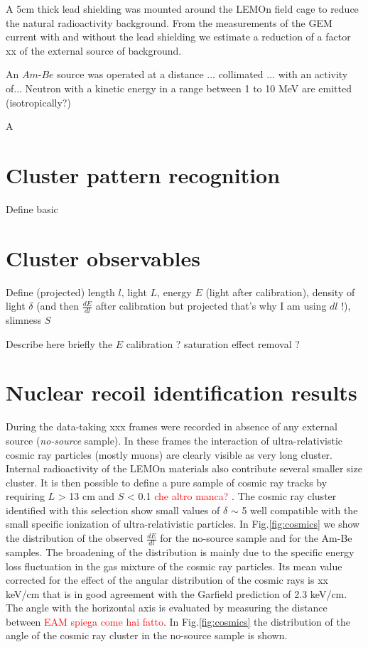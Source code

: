 \documentclass[12pt]{iopart}
\begin{document}
A  5cm thick lead shielding was mounted around the LEMOn field cage to reduce the natural radioactivity background. From the measurements of the GEM current with and without the lead shielding  we estimate a reduction of a factor xx of the external source of background.

 An $Am$-$Be$ source was operated  at a distance ... collimated ... with an activity of...
 Neutron with a kinetic energy in a range between 1 to 10 MeV are emitted (isotropically?) 
 
 A 
 







 \section{Cluster pattern recognition}
 

Define basic 
 \section{Cluster observables}
 
 Define  (projected) length $l$, light $L$, energy $E$ (light after calibration), density of light $\delta$ (and then $\frac{dE}{dl}$ after calibration but projected that's why I am using $dl$ !), slimness $S$
 
 Describe here briefly the $E$ calibration ? saturation effect removal ? 
 
 \section{Nuclear recoil identification results}
 
 During the data-taking xxx frames were recorded in absence of any external source ({\it no-source} sample). In these frames the interaction of ultra-relativistic cosmic ray particles (mostly muons) are clearly visible  as  very long cluster. Internal radioactivity of the LEMOn materials  also contribute several smaller size cluster.  It is then possible to define a pure sample of cosmic ray tracks by requiring $L$ > 13 cm and $S$ < 0.1  \textcolor{red}{che altro manca? }. The cosmic ray cluster identified with this selection show small values of  $\delta$ $\sim $ 5 well compatible with the small specific ionization of ultra-relativistic particles. 
 In Fig.\ref{fig:cosmics} we show the distribution of the observed $\frac{dE}{dl}$ for the no-source sample and for the Am-Be samples. The broadening of the distribution is mainly due to the specific energy loss fluctuation in the gas mixture of the cosmic ray particles.   Its mean value corrected for the effect of the angular distribution of the cosmic rays is   xx keV/cm that is in good agreement with the Garfield prediction of 2.3 keV/cm.  The angle with the horizontal axis is evaluated by  measuring the distance between \textcolor{red}{EAM spiega come hai fatto}. In Fig.\ref{fig:cosmics} the distribution   of the  angle of the cosmic ray cluster in the no-source sample is shown.
 
\end{document}
